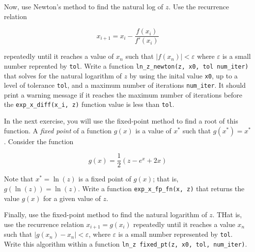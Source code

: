 \documentclass[11pt]{exam}
\begin{document}
\begin{questions}
\question Now, use Newton's method to find the natural log of $z$. Use the recurrence relation 

$$x_{i+1} = x_{i} - \frac{f(x_{i})}{f'(x_{i})}$$

repeatedly until it reaches a value of $x_{n}$ such that $|f(x_{n})| < \varepsilon$ where $\varepsilon$ is a small number reprented by \texttt{tol}. Write a function \texttt{ln\_z\_newton(z, x0, tol num\_iter)} that solves for the natural logarithm of $z$ by using the inital value \texttt{x0}, up to a level of tolerance \texttt{tol}, and a maximum number of iterations \texttt{num\_iter}. It should print a warning message if it reaches the maximum number of iterations before the \texttt{exp\_x\_diff(x\_i, z)} function value is less than \texttt{tol}.

\question In the next exercise, you will use the fixed-point method to find a root of this function. A \textit{fixed point} of a function $g(x)$ is a value of $x^{*}$ such that $g(x^{*}) = x^{*}$. Consider the function

$$g(x) = \frac{1}{2}(z-e^{x}+2x)$$

Note that $x^{*} = \ln(z)$ is a fixed point of $g(x)$; that is, $g(\ln(z)) = \ln(z)$. Write a function \texttt{exp\_x\_fp\_fn(x, z)} that returns the value $g(x)$ for a given value of $z$.

\question Finally, use the fixed-point method to find the natural logarithm of $z$. THat is, use the recurrence relation $x_{i+1} = g(x_{i})$ repeatedly until it reaches a value $x_{n}$ such that $|g(x_{n}) - x_{n}| < \varepsilon$, where $\varepsilon$ is a small number represented by \texttt{tol}. Write this algorithm within a function \texttt{ln\_z fixed\_pt(z, x0, tol, num\_iter)}.

    \end{questions}
\end{document}
